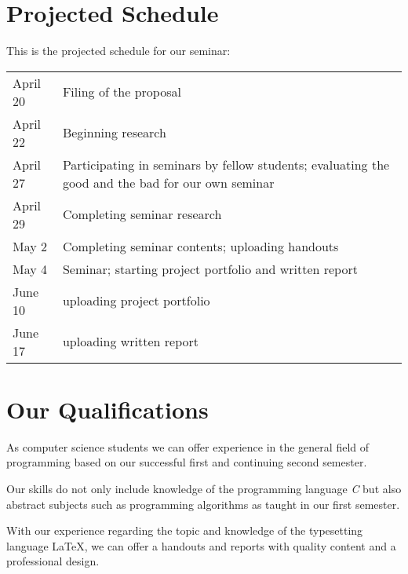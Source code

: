 \section*{Projected Schedule}
This is the projected schedule for our seminar:\\
\begin{tabular}{L{0.15} L{0.7}}
April 20 & Filing of the proposal\\
April 22 & Beginning research\\
April 27 \newline & Participating in seminars by fellow students;\newline 
evaluating the good and the bad for our own seminar\\
April 29 & Completing seminar research\\
May 2 & Completing seminar contents; uploading handouts\\
May 4 & Seminar; starting project portfolio and written report\\
June 10 & uploading project portfolio\\
June 17 & uploading written report
\end{tabular}
\section*{Our Qualifications}
As computer science students we can offer experience in the general field of programming based on our successful first and continuing second semester.

Our skills do not only include knowledge of the programming language \emph{C} but also abstract subjects such as programming algorithms as taught in our first semester.

With our experience regarding the topic and knowledge of the typesetting language \LaTeX, we can offer a handouts and reports with quality content and a professional design.
 
